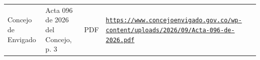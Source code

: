 \documentclass[11pt,letterpaper]{article}
\begin{document}
{\begin{xltabular}{\linewidth}{L{2.8cm}YL{1.6cm}Y}
Concejo de Envigado & Acta 096 de 2026 del Concejo, p.\allowbreak{} 3 & PDF & \texttt{\footnotesize \href{https://www.concejoenvigado.gov.co/wp-content/uploads/2026/09/Acta-096-de-2026.pdf}{https:/\allowbreak{}}\allowbreak{}\href{https://www.concejoenvigado.gov.co/wp-content/uploads/2026/09/Acta-096-de-2026.pdf}{/\allowbreak{}}\allowbreak{}\href{https://www.concejoenvigado.gov.co/wp-content/uploads/2026/09/Acta-096-de-2026.pdf}{www.\allowbreak{}concejoenvigado.\allowbreak{}gov.\allowbreak{}co/\allowbreak{}}\allowbreak{}\href{https://www.concejoenvigado.gov.co/wp-content/uploads/2026/09/Acta-096-de-2026.pdf}{wp-\allowbreak{}content/\allowbreak{}}\allowbreak{}\href{https://www.concejoenvigado.gov.co/wp-content/uploads/2026/09/Acta-096-de-2026.pdf}{uploads/\allowbreak{}}\allowbreak{}\href{https://www.concejoenvigado.gov.co/wp-content/uploads/2026/09/Acta-096-de-2026.pdf}{2026/\allowbreak{}}\allowbreak{}\href{https://www.concejoenvigado.gov.co/wp-content/uploads/2026/09/Acta-096-de-2026.pdf}{09/\allowbreak{}}\allowbreak{}\href{https://www.concejoenvigado.gov.co/wp-content/uploads/2026/09/Acta-096-de-2026.pdf}{Acta-\allowbreak{}096-\allowbreak{}de-\allowbreak{}2026.\allowbreak{}pdf}} \\

\end{xltabular}}
\end{document}
